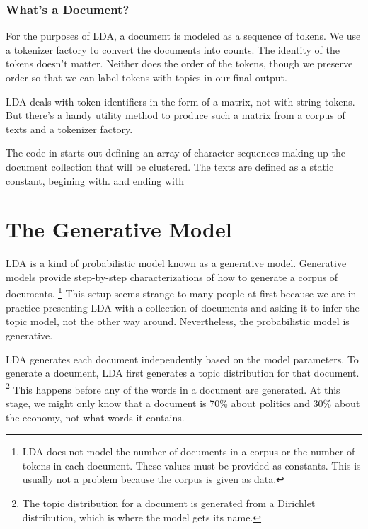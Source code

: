 \subsubsection{What's a Document?}

For the purposes of LDA, a document is modeled as a sequence of
tokens.  We use a tokenizer factory to convert the documents into
counts.  The identity of the tokens doesn't matter.  Neither does
the order of the tokens, though we preserve order so that we can
label tokens with topics in our final output.

LDA deals with token identifiers in the form of a matrix, not
with string tokens.  But there's a handy utility method to produce
such a matrix from a corpus of texts and a tokenizer factory.

The code in  starts out defining an array of
character sequences making up the document collection that will
be clustered.  The texts are defined as a static constant, begining
with.
%
%
and ending with
%






\section{The Generative Model}

LDA is a kind of probabilistic model known as a generative model.
Generative models provide step-by-step characterizations of how to
generate a corpus of documents.%
%
\footnote{LDA does not model the number of documents in a corpus
or the number of tokens in each document.  These values must be
provided as constants.  This is usually not a problem because
the corpus is given as data.}
%
This setup seems strange to many people at first because we are in
practice presenting LDA with a collection of documents and asking it
to infer the topic model, not the other way around.  Nevertheless, the
probabilistic model is generative.

LDA generates each document independently based on the model
parameters.  To generate a document, LDA first generates a topic
distribution for that document.%
%
\footnote{The topic distribution for a document is generated from
a Dirichlet distribution, which is where the model gets its name.}
%
This happens before any of the words in a document are generated.  At
this stage, we might only know that a document is 70\% about politics
and 30\% about the economy, not what words it contains.

